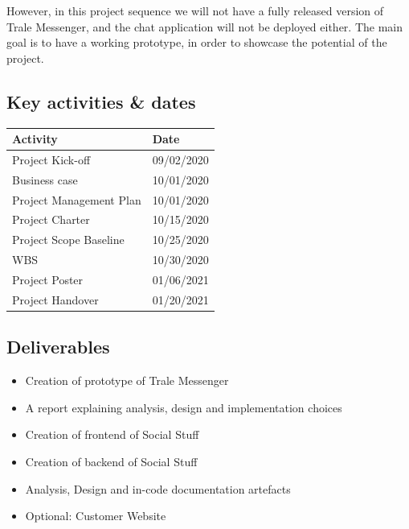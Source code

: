 However, in this project sequence we will not have a fully released version of Trale Messenger, and the chat application
will not be deployed either.
The main goal is to have a working prototype, in order to showcase the potential of the project.

\subsection{Key activities \& dates}\label{subsec:key-activities-and-dates}

\begin{table}[H]
    \centering
    \begin{tabular}{@{}|l|l|@{}}
        \toprule
        \textbf{Activity}       & \textbf{Date} \\
        \midrule
        Project Kick-off        & 09/02/2020     \\
        \midrule
        Business case           & 10/01/2020    \\
        \midrule
        Project Management Plan & 10/01/2020    \\
        \midrule
        Project Charter         & 10/15/2020    \\
        \midrule
        Project Scope Baseline  & 10/25/2020    \\
        \midrule
        WBS                     & 10/30/2020    \\
        \midrule
        Project Poster          & 01/06/2021    \\
        \midrule
        Project Handover        & 01/20/2021    \\
        \bottomrule
    \end{tabular}
    \label{tab:table2}
\end{table}

\subsection{Deliverables}\label{subsec:deliverables}

\begin{itemize}
    \setlength\itemsep{-0.5em}
    \item Creation of prototype of Trale Messenger
    \item A report explaining analysis, design and implementation choices
    \item Creation of frontend of Social Stuff
    \item Creation of backend of Social Stuff
    \item Analysis, Design and in-code documentation artefacts
    \item Optional: Customer Website
\end{itemize}

